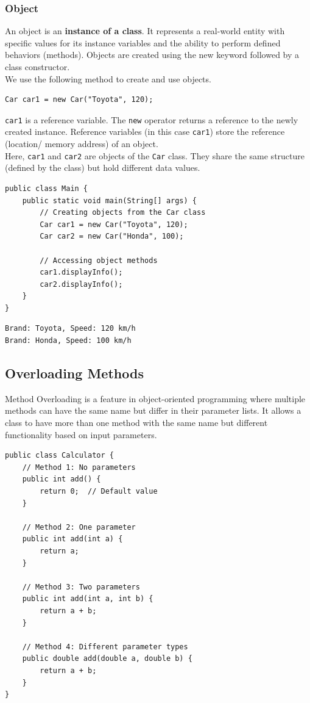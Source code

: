 \documentclass[letterpaper,12pt]{article}
\begin{document}
\subsubsection{Object}
An object is an \textbf{instance of a class}. It represents a real-world entity with specific values for its instance variables and the ability to perform defined behaviors (methods). Objects are created using the new keyword followed by a class constructor.\\
We use the following method to create and use objects.
\begin{verbatim}
Car car1 = new Car("Toyota", 120);
\end{verbatim}
\texttt{car1} is a reference variable. The \texttt{new} operator returns a reference to the newly created instance. Reference variables (in this case \texttt{car1}) store the reference (location/ memory address) of an object.\\
Here, \texttt{car1} and \texttt{car2} are objects of the \texttt{Car} class. They share the same structure (defined by the class) but hold different data values.
\begin{verbatim}
public class Main {
    public static void main(String[] args) {
        // Creating objects from the Car class
        Car car1 = new Car("Toyota", 120);
        Car car2 = new Car("Honda", 100);

        // Accessing object methods
        car1.displayInfo();
        car2.displayInfo();
    }
}
\end{verbatim}
\begin{verbatim}
Brand: Toyota, Speed: 120 km/h
Brand: Honda, Speed: 100 km/h
\end{verbatim}
\subsection{Overloading Methods}
Method Overloading is a feature in object-oriented programming where multiple methods can have the same name but differ in their parameter lists. It allows a class to have more than one method with the same name but different functionality based on input parameters.
\begin{verbatim}
public class Calculator {
    // Method 1: No parameters
    public int add() {
        return 0;  // Default value
    }

    // Method 2: One parameter
    public int add(int a) {
        return a;
    }

    // Method 3: Two parameters
    public int add(int a, int b) {
        return a + b;
    }

    // Method 4: Different parameter types
    public double add(double a, double b) {
        return a + b;
    }
}
\end{verbatim}
\end{document}
